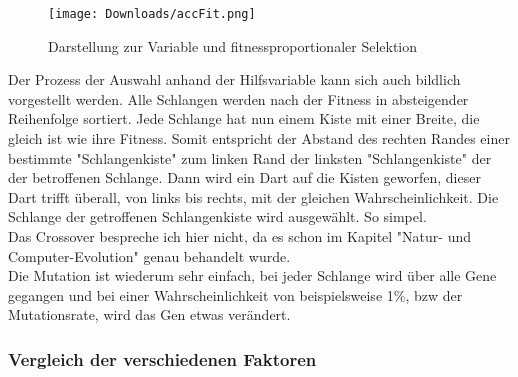 \documentclass[10pt,a4paper,ngerman,english]{article}
\begin{document}
\begin{wrapfigure}{r}{0.5\textwidth} 
    \vspace{-20pt}
        \begin{center}
            \texttt{[image: Downloads/accFit.png]}
            \caption{Darstellung zur Variable  und fitnessproportionaler Selektion}
        \end{center}
    \vspace{-15pt}
\end{wrapfigure} 

Der Prozess der Auswahl anhand der Hilfsvariable  kann sich auch bildlich vorgestellt werden. Alle Schlangen werden nach der Fitness in absteigender Reihenfolge sortiert. Jede Schlange hat nun einem Kiste mit einer Breite, die gleich ist wie ihre Fitness. Somit entspricht der Abstand des rechten Randes einer bestimmte "Schlangenkiste" zum linken Rand der linksten "Schlangenkiste" der  der betroffenen Schlange. Dann wird ein Dart auf die Kisten geworfen, dieser Dart trifft überall, von links bis rechts, mit der gleichen Wahrscheinlichkeit. Die Schlange der getroffenen Schlangenkiste wird ausgewählt. So simpel.\\

Das Crossover bespreche ich hier nicht, da es schon im Kapitel "Natur- und Computer-Evolution" genau behandelt wurde.\\

Die Mutation ist wiederum sehr einfach, bei jeder Schlange wird über alle Gene gegangen und bei einer Wahrscheinlichkeit von beispielsweise 1\%, bzw der Mutationsrate, wird das Gen etwas verändert.

\subsubsection{Vergleich der verschiedenen Faktoren}
\end{document}

